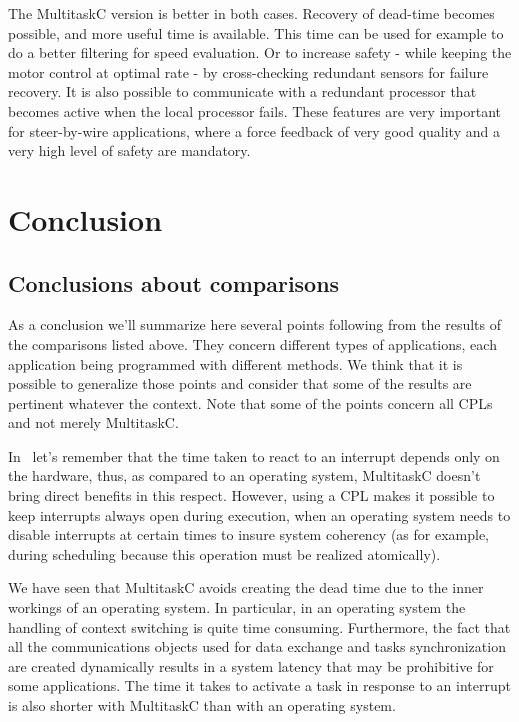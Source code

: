 \documentclass[10pt]{report}
\begin{document}
The MultitaskC version is better in both cases. Recovery of dead-time becomes possible, and more useful time is available. 
This time can be used for example to do a better filtering for speed evaluation. Or to increase safety - while keeping the 
motor control at optimal rate - by cross-checking redundant sensors for failure recovery. It is also possible to communicate 
with a redundant processor that becomes active when the local processor fails. 
These features are very important for steer-by-wire applications, where a force feedback of very good quality and a very 
high level of safety are mandatory.

\chapter{Conclusion}
\label{sec:conclusion}

\section{Conclusions about comparisons}

As a conclusion we'll summarize here several points following from the results of the comparisons listed above. 
They concern different types of applications, each application being programmed with different methods. We think that 
it is possible to generalize those points and consider that some of the results are pertinent whatever the context. 
Note that some of the points concern all CPLs and not merely MultitaskC.

In~\cite{Delchini:95} let's remember that the time taken to react to an interrupt depends only on the hardware, 
thus, as compared to an operating system, MultitaskC doesn't bring direct benefits in this respect. However, using 
a CPL makes it possible to keep interrupts always open during execution, when an operating system needs to disable 
interrupts at certain times to insure system coherency (as for example, during scheduling because this operation must be 
realized atomically).

We have seen that MultitaskC avoids creating the dead time due to the inner workings of an operating system.
In particular, in an operating system the handling of context switching is quite time consuming. Furthermore, the fact that all 
the communications objects used for data exchange and tasks synchronization are created dynamically results in a system latency 
that may be prohibitive for some applications. The time it takes to activate a task in response to an interrupt is also shorter 
with MultitaskC than with an operating system.
\end{document}
